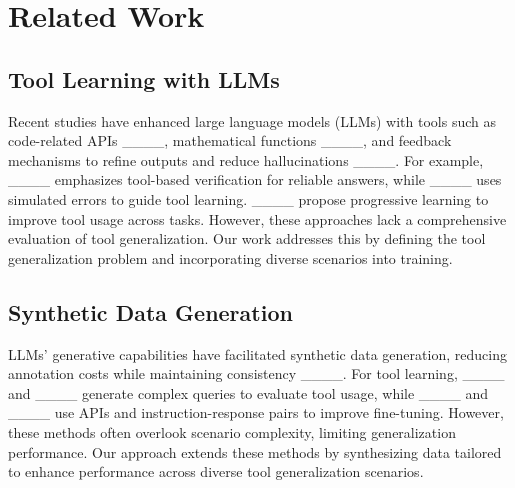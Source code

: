 \section{Related Work}
\subsection{Tool Learning with LLMs}  
Recent studies have enhanced large language models (LLMs) with tools such as code-related APIs ____, mathematical functions ____, and feedback mechanisms to refine outputs and reduce hallucinations ____. For example, ____ emphasizes tool-based verification for reliable answers, while ____ uses simulated errors to guide tool learning. ____ propose progressive learning to improve tool usage across tasks. However, these approaches lack a comprehensive evaluation of tool generalization. Our work addresses this by defining the tool generalization problem and incorporating diverse scenarios into training.  



\subsection{Synthetic Data Generation}
LLMs' generative capabilities have facilitated synthetic data generation, reducing annotation costs while maintaining consistency ____. For tool learning, ____ and ____ generate complex queries to evaluate tool usage, while ____ and ____ use APIs and instruction-response pairs to improve fine-tuning. However, these methods often overlook scenario complexity, limiting generalization performance. Our approach extends these methods by synthesizing data tailored to enhance performance across diverse tool generalization scenarios.

